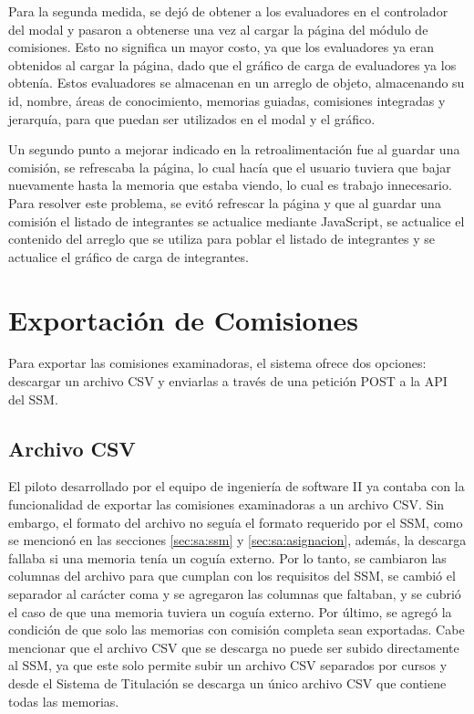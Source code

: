 Para la segunda medida, se dejó de obtener a los evaluadores en el controlador del modal
y pasaron a obtenerse una vez al cargar la página del módulo de comisiones. Esto no significa
un mayor costo, ya que los evaluadores ya eran obtenidos al cargar la página, dado que el
gráfico de carga de evaluadores ya los obtenía. Estos evaluadores se almacenan en un
arreglo de objeto, almacenando su id, nombre, áreas de conocimiento, memorias guiadas,
comisiones integradas y jerarquía, para que puedan ser utilizados en el modal y el gráfico.

Un segundo punto a mejorar indicado en la retroalimentación fue al guardar una comisión,
se refrescaba la página, lo cual hacía que el usuario tuviera que bajar nuevamente hasta
la memoria que estaba viendo, lo cual es trabajo innecesario. Para resolver este problema,
se evitó refrescar la página y que al guardar una comisión el listado de integrantes se actualice
mediante JavaScript, se actualice el contenido del arreglo que se utiliza para poblar el listado de integrantes
y se actualice el gráfico de carga de integrantes.


\section{Exportación de Comisiones}
Para exportar las comisiones examinadoras, el sistema ofrece dos opciones: descargar
un archivo CSV y enviarlas a través de una petición POST a la API del SSM.

\subsection{Archivo CSV}
El piloto desarrollado por el equipo de ingeniería de software II ya contaba con la
funcionalidad de exportar las comisiones examinadoras a un archivo CSV. Sin embargo,
el formato del archivo no seguía el formato requerido por el SSM, como se mencionó en las
secciones \ref{sec:sa:ssm} y \ref{sec:sa:asignacion}, además, la descarga fallaba si una
memoria tenía un coguía externo. Por lo tanto, se cambiaron las
columnas del archivo para que cumplan con los requisitos del SSM, se cambió el separador
al carácter coma y se agregaron las columnas que faltaban, y se cubrió el caso de que una
memoria tuviera un coguía externo. Por último, se agregó la condición de que solo las
memorias con comisión completa sean exportadas. Cabe mencionar que el archivo CSV
que se descarga no puede ser subido directamente al SSM, ya que este solo permite subir
un archivo CSV separados por cursos y desde el Sistema de Titulación se descarga un único
archivo CSV que contiene todas las memorias.


